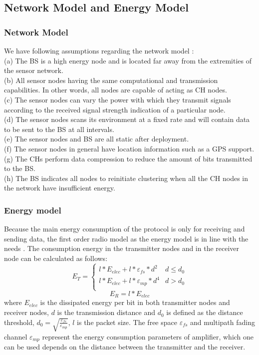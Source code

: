 \documentclass[11pt]{report}
\begin{document}
	\subsection{Network Model and Energy Model}
	\subsubsection{Network Model}
	We have following assumptions regarding the network model \cite{article} \cite{7763028}:\\
	(a) The BS is a high energy node and is located far away from the extremities of the sensor network.\\
	(b) All sensor nodes having the same computational and transmission capabilities. In other words, all nodes are capable of acting as CH nodes.\\
	(c) The sensor nodes can vary the power with which they transmit signals according to the received signal strength indication of a particular node.\\
	(d) The sensor nodes scans its environment at a fixed rate and will contain data to be sent to the BS at all intervals.\\
	(e) The sensor nodes and BS are all static after deployment.\\
	(f) The sensor nodes in general have location information such as a GPS support.\\
	(g) The CHs perform data compression to reduce the amount of bits transmitted to the BS.\\
	(h) The BS indicates all nodes to reinitiate clustering when all the CH nodes in the network have insufficient energy.
	
	\subsubsection{Energy model}
	
	Because the main energy consumption of the protocol is only for receiving and sending data, the first order radio model as the energy model is in line with the needs \cite{1045297}. The consumption energy in the transmitter nodes and in the receiver node can be calculated as follows:
	\begin{equation}
	E_{T}=\left\{ \begin{array}{ll}
	l * E_{elec} + l * \varepsilon_{fs} * d^2 & d \leq d_0 \\
	l * E_{elec} + l * \varepsilon_{mp} * d^4 & d > d_0 \\
	\end{array} \right.
	\end{equation}
	\begin{equation}
	E_R = l * E_{elec}
	\end{equation}
	where $E_{elec}$ is the dissipated energy per bit in both transmitter nodes and receiver nodes, $d$ is the transmission distance and $d_0$ is defined as the distance threshold, $d_0 = \sqrt{\frac{\varepsilon_{fs}}{\varepsilon_{mp}}}$, $l$ is the packet size. The free space $\varepsilon_{fs}$ and multipath fading channel $\varepsilon_{mp}$ represent the energy consumption parameters of amplifier, which one can be used depends on the distance between the transmitter and the receiver. 
	
\end{document}
